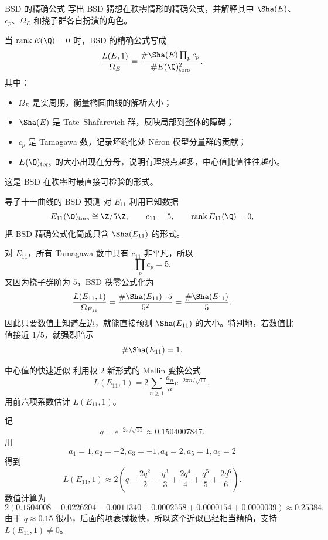 \begin{problem}{BSD 的精确公式}
\medium
写出 BSD 猜想在秩零情形的精确公式，并解释其中 $\Sha(E)$、$c_p$、$\Omega_E$ 和挠子群各自扮演的角色。
\end{problem}
\begin{solution}
当 $\operatorname{rank}E(\Q)=0$ 时，BSD 的精确公式写成
\[
\frac{L(E,1)}{\Omega_E}=\frac{\#\Sha(E)\prod_p c_p}{\#E(\Q)_{\mathrm{tors}}^2}.
\]
其中：
\begin{itemize}
  \item $\Omega_E$ 是实周期，衡量椭圆曲线的解析大小；
  \item $\Sha(E)$ 是 Tate--Shafarevich 群，反映局部到整体的障碍；
  \item $c_p$ 是 Tamagawa 数，记录坏约化处 N\'eron 模型分量群的贡献；
  \item $E(\Q)_{\mathrm{tors}}$ 的大小出现在分母，说明有理挠点越多，中心值比值往往越小。
\end{itemize}
这是 BSD 在秩零时最直接可检验的形式。
\end{solution}

\begin{problem}{导子十一曲线的 BSD 预测}
\medium
对 $E_{11}$ 利用已知数据
\[
E_{11}(\Q)_{\mathrm{tors}}\cong \Z/5\Z,
\qquad c_{11}=5,
\qquad \operatorname{rank}E_{11}(\Q)=0,
\]
把 BSD 精确公式化简成只含 $\Sha(E_{11})$ 的形式。
\end{problem}
\begin{solution}
对 $E_{11}$，所有 Tamagawa 数中只有 $c_{11}$ 非平凡，所以
\[
\prod_p c_p=5.
\]
又因为挠子群阶为 $5$，BSD 秩零公式化为
\[
\frac{L(E_{11},1)}{\Omega_{E_{11}}}
=\frac{\#\Sha(E_{11})\cdot 5}{5^2}
=\frac{\#\Sha(E_{11})}{5}.
\]
因此只要数值上知道左边，就能直接预测 $\Sha(E_{11})$ 的大小。特别地，若数值比值接近 $1/5$，就强烈暗示
\[
\#\Sha(E_{11})=1.
\]
\end{solution}

\begin{problem}{中心值的快速近似}
\medium
利用权 $2$ 新形式的 Mellin 变换公式
\[
L(E_{11},1)=2\sum_{n\ge1}\frac{a_n}{n}e^{-2\pi n/\sqrt{11}},
\]
用前六项系数估计 $L(E_{11},1)$。
\end{problem}
\begin{solution}
记
\[
q=e^{-2\pi/\sqrt{11}}\approx 0.1504007847.
\]
用
\[
a_1=1,a_2=-2,a_3=-1,a_4=2,a_5=1,a_6=2
\]
得到
\[
L(E_{11},1)\approx 2\left(q-\frac{2q^2}{2}-\frac{q^3}{3}+\frac{2q^4}{4}+\frac{q^5}{5}+\frac{2q^6}{6}\right).
\]
数值计算为
\[
2\left(0.1504008-0.0226204-0.0011340+0.0002558+0.0000154+0.0000039\right)
\approx 0.25384.
\]
由于 $q\approx 0.15$ 很小，后面的项衰减极快，所以这个近似已经相当精确，支持 $L(E_{11},1)\ne 0$。
\end{solution}


